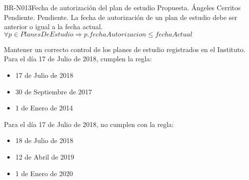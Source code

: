 \begin{BusinessRule}{BR-N013}{Fecha de autorización del plan de estudio	}
	{\bcIntegridad}    %
	{\btEnabler}     %
	{\blControlling}    %
	\BRItem[Estado] Propuesta.
	 Ángeles Cerritos
	 Pendiente.
	 Pendiente.
	\BRItem[Descripción] La fecha de autorización de un plan de estudio debe ser anterior o igual a la fecha actual.
	\BRItem[Sentencia]
	$	\forall p \in PlanesDeEstudio \Rightarrow p.fechaAutorizacion \leq fechaActual $


	\BRItem[Motivación] Mantener un correcto control de los planes de estudio registrados en el Instituto.
	 Para el día 17 de Julio de 2018, cumplen la regla:
	\begin{itemize}
		\item 17 de Julio de 2018
		\item 30 de Septiembre de 2017
		\item 1 de Enero de 2014
	\end{itemize}
	 Para el día 17 de Julio de 2018, no cumplen con la regla:
	\begin{itemize}
		\item 18 de Julio de 2018
		\item 12 de Abril de 2019
		\item 1 de Enero de 2020
	\end{itemize}
	
\end{BusinessRule}


